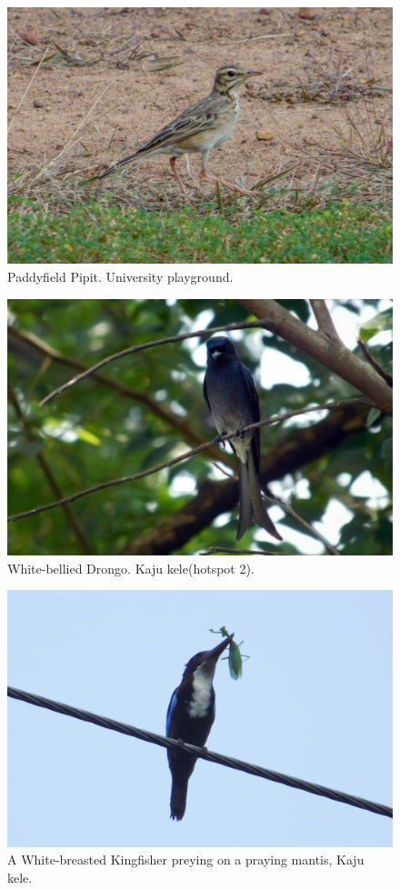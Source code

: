 \begin{figure}[!htpb]
    \centering
    \includegraphics[width=\linewidth]{Figures/pipit.JPG}
    \caption[]{Paddyfield Pipit. University playground.}
    \label{fig:figure-01}
\end{figure}
\begin{figure}[!htpb]
    \centering
    \includegraphics[width=\linewidth]{Figures/drongo.jpg}
    \caption[]{White-bellied Drongo. Kaju kele(hotspot 2).}
    \label{fig:figure-01}
\end{figure}
\begin{figure}[!htpb]
    \centering
    \includegraphics[width=\linewidth]{Figures/kingfisher.JPG}
    \caption[]{A White-breasted Kingfisher preying on a praying mantis, Kaju kele.}
    \label{fig:figure-01}
\end{figure}
